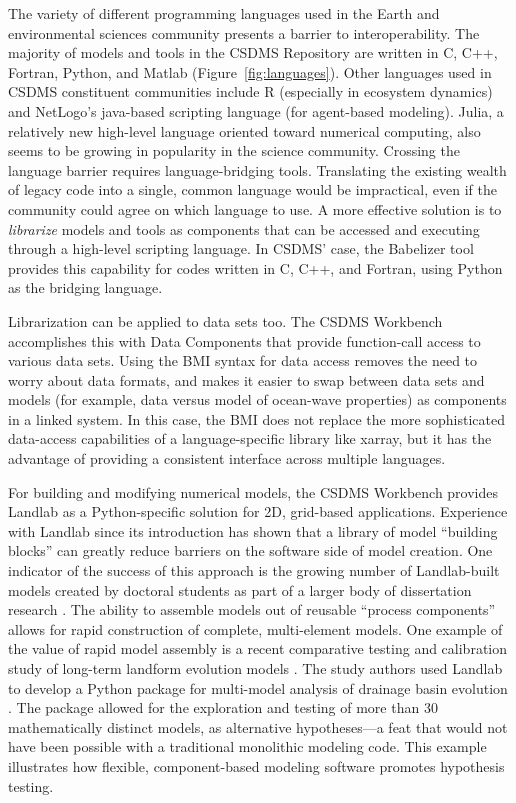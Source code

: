 \documentclass[journal abbreviation, manuscript]{copernicus}
\begin{document}
The variety of different programming languages used in the Earth and environmental sciences community presents a barrier to interoperability. The majority of models and tools in the CSDMS Repository are written in C, C++, Fortran, Python, and Matlab (Figure~\ref{fig:languages}). Other languages used in CSDMS constituent communities include R (especially in ecosystem dynamics) and NetLogo's java-based scripting language (for agent-based modeling). Julia, a relatively new high-level language oriented toward numerical computing, also seems to be growing in popularity in the science community. Crossing the language barrier requires language-bridging tools. Translating the existing wealth of legacy code into a single, common language would be impractical, even if the community could agree on which language to use. A more effective solution is to \textit{librarize} models and tools \citep{brown2014run} as components that can be accessed and executing through a high-level scripting language. In CSDMS' case, the Babelizer tool provides this capability for codes written in C, C++, and Fortran, using Python as the bridging language.

Librarization can be applied to data sets too. The CSDMS Workbench accomplishes this with Data Components that provide function-call access to various data sets. Using the BMI syntax for data access removes the need to worry about data formats, and makes it easier to swap between data sets and models (for example, data versus model of ocean-wave properties) as components in a linked system. In this case, the BMI does not replace the more sophisticated data-access capabilities of a language-specific library like xarray, but it has the advantage of providing a consistent interface across multiple languages.

For building and modifying numerical models, the CSDMS Workbench provides Landlab as a Python-specific solution for 2D, grid-based applications. Experience with Landlab since its introduction has shown that a library of model ``building blocks'' can greatly reduce barriers on the software side of model creation. One indicator of the success of this approach is the growing number of  Landlab-built models created by doctoral students as part of a larger body of dissertation research \citep[e.g.,][]{adams2017landlab,gray2017off,shobe2017space,lai2018modeled,langston2018developing,schmid2018effect,strauch2018hydroclimatological,glade2019canyon,reitman2019offset,carriere2020impact,litwin2020groundwaterdupuitpercolator}. The ability to assemble models out of reusable ``process components'' allows for rapid construction of complete, multi-element models. One example of the value of rapid model assembly is a recent  comparative testing and calibration study of long-term landform evolution models \citep{barnhart2020inverting1,barnhart2020inverting2}. The study authors used Landlab to develop a Python package for multi-model analysis of drainage basin evolution \citep{barnhart2019terrainbento}. The package allowed for the exploration and testing of more than 30 mathematically distinct models, as alternative hypotheses---a feat that would not have been possible with a traditional monolithic modeling code. This example illustrates how flexible, component-based modeling software promotes hypothesis testing. 
\end{document}
